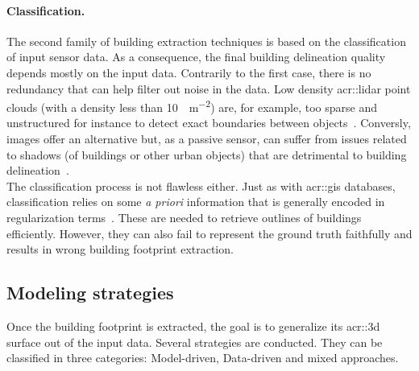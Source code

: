         \paragraph{Classification.}
            The second family of building extraction techniques is based on the classification of input sensor data.
            As a consequence, the final building delineation quality depends mostly on the input data.
            Contrarily to the first case, there is no redundancy that can help filter out noise in the data.
            Low density \gls{acr::lidar} point clouds (with a density less than \SI{10}{\pts\per\m \squared}) are, for example, too sparse and unstructured for instance to detect exact boundaries between objects~\parencite{michelin2012building}.
            Conversly, images offer an alternative but, as a passive sensor, can suffer from issues related to shadows (of buildings or other urban objects) that are detrimental to building delineation~\parencite{adeline2013shadow}.\\

            The classification process is not flawless either.
            Just as with \gls{acr::gis} databases, classification relies on some \textit{a priori} information that is generally encoded in regularization terms~\parencite{lafarge2008structural,zhu2018large,zeng2018neural}.
            These are needed to retrieve outlines of buildings efficiently.
            However, they can also fail to represent the ground truth faithfully and results in wrong building footprint extraction.

    \subsection{Modeling strategies}
        \label{subsec::state_of_the_art::building_modeling::modeling_strategies}
        Once the building footprint is extracted, the goal is to generalize its \gls{acr::3d} surface out of the input data.
        Several strategies are conducted.
        They can be classified in three categories: Model-driven, Data-driven and mixed approaches.\\

